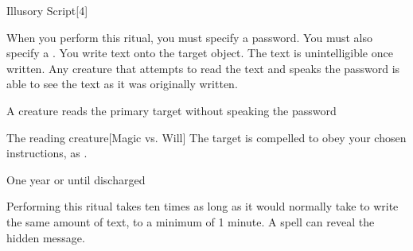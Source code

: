 \begin{spellsection}{Illusory Script}[4]
    \begin{spellheader}
    \end{spellheader}
    \begin{spellcontent}
        \begin{spelltargetinginfo}
        \end{spelltargetinginfo}
        \begin{spelleffects}

            \spellspecial When you perform this ritual, you must specify a password. You must also specify a .
            \spelleffect You write text onto the target object. The text is unintelligible once written. Any creature that attempts to read the text and speaks the password is able to see the text as it was originally written.
            \begin{spelltrigger}{A creature reads the primary target without speaking the password}
                \begin{spelltarget}{The reading creature}[Magic vs. Will]
                    \spellsuccess The target is compelled to obey your chosen instructions, as .
                \end{spelltarget}
            \end{spelltrigger}
            \spelldur One year or until discharged \dismissable
        \end{spelleffects}
    \end{spellcontent}
    \begin{spellfooter}
        \spellnotes Performing this ritual takes ten times as long as it would normally take to write the same amount of text, to a minimum of 1 minute. A  spell can reveal the hidden message.
    \end{spellfooter}
\end{spellsection}

